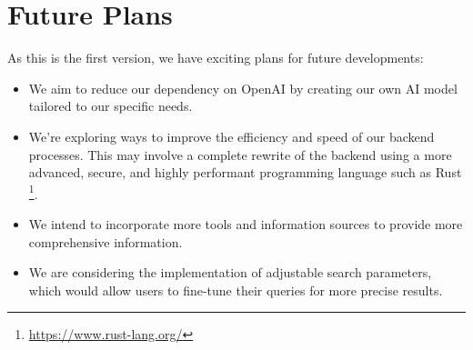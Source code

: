 \documentclass[
    a4paper,
    pagesize,
	pdftex,
    12pt,
]{scrartcl}
\begin{document}
\section{Future Plans}
As this is the first version, we have exciting plans for future developments:
\begin{itemize}
  \item We aim to reduce our dependency on OpenAI by creating our own AI model tailored to our specific needs.
  \item We're exploring ways to improve the efficiency and speed of our backend processes. This may involve a complete rewrite of the backend using a more advanced, secure, and highly performant programming language such as Rust \footnote{\url{https://www.rust-lang.org/}}.
  \item We intend to incorporate more tools and information sources to provide more comprehensive information.
  \item We are considering the implementation of adjustable search parameters, which would allow users to fine-tune their queries for more precise results.
\end{itemize}


\newpage



\end{document}

